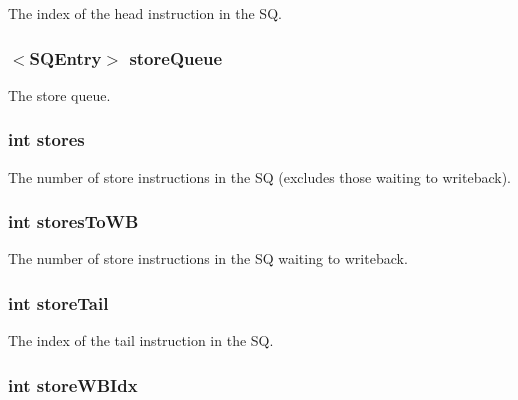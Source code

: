 \label{classOzoneLSQ_a6e87b6f77102183080ea6ab8599b26a9}
The index of the head instruction in the SQ. \hypertarget{classOzoneLSQ_a1d370cdc36d253e0f786d46c6af77a40}{
\subsubsection[{storeQueue}]{$<${\bf SQEntry}$>$ {\bf storeQueue}}}
\label{classOzoneLSQ_a1d370cdc36d253e0f786d46c6af77a40}
The store queue. \hypertarget{classOzoneLSQ_ade9e895aa9c5ace27779c985c4f43326}{
\subsubsection[{stores}]{\setlength{\rightskip}{0pt plus 5cm}int {\bf stores}}}
\label{classOzoneLSQ_ade9e895aa9c5ace27779c985c4f43326}
The number of store instructions in the SQ (excludes those waiting to writeback). \hypertarget{classOzoneLSQ_a3831a7965ffbe90df177026988476f9c}{
\subsubsection[{storesToWB}]{\setlength{\rightskip}{0pt plus 5cm}int {\bf storesToWB}}}
\label{classOzoneLSQ_a3831a7965ffbe90df177026988476f9c}
The number of store instructions in the SQ waiting to writeback. \hypertarget{classOzoneLSQ_acd5c7fbb5578b5cb505ffff16bbf6a8b}{
\subsubsection[{storeTail}]{\setlength{\rightskip}{0pt plus 5cm}int {\bf storeTail}}}
\label{classOzoneLSQ_acd5c7fbb5578b5cb505ffff16bbf6a8b}
The index of the tail instruction in the SQ. \hypertarget{classOzoneLSQ_a9023e0813d4f3e566d17fb6334a2da02}{
\subsubsection[{storeWBIdx}]{\setlength{\rightskip}{0pt plus 5cm}int {\bf storeWBIdx}}}
